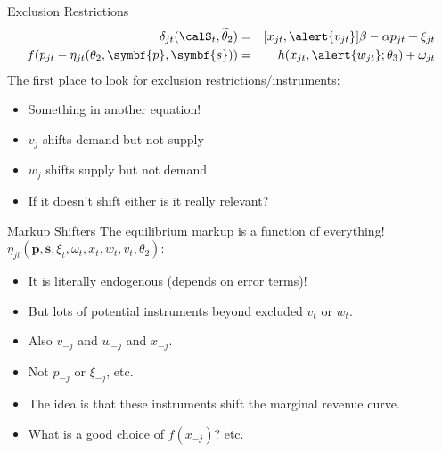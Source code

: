 \begin{frame}{Exclusion Restrictions}
\begin{eqnarray*}
    \delta_{jt}(\calS_t,\widetilde{\theta}_2) &=&  [x_{jt}, \alert{v_{jt}}]  \beta  - \alpha p_{jt} + \xi_{jt}\\
    f(p_{jt} - \eta_{jt}(\theta_2,\symbf{p},\symbf{s})) &=&   h(x_{jt},\alert{w_{jt}};\theta_3)+\omega_{jt}
\end{eqnarray*}
The first place to look for exclusion restrictions/instruments:
\begin{itemize}
\item Something in another equation!
\item $v_j$ shifts demand but not supply
\item $w_j$ shifts supply but not demand
\item If it doesn't shift either is it really relevant?
\end{itemize}
\end{frame}


\begin{frame}{Markup Shifters}
The equilibrium markup is a function of \alert{everything!} $\eta_{jt}(\symbf{p},\symbf{s},\xi_t,\omega_t,x_{t},w_{t},v_t,\theta_2)$:
\begin{itemize}
\item It is literally \alert{endogenous} (depends on error terms)!
\item But lots of potential instruments beyond \alert{excluded} $v_t$ or $w_t$.
\item Also $v_{-j}$ and $w_{-j}$ and $x_{-j}$.
\item Not $p_{-j}$ or $\xi_{-j}$, etc.
\item The idea is that these instruments shift the \alert{marginal revenue curve}.
\item What is a good choice of $f(x_{-j})$? etc.
\end{itemize}
\end{frame}





